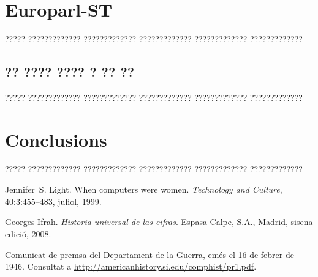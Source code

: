 \documentclass[11pt,english,listoffigures,listoftables]{tfgetsinf}
\begin{document}
\chapter{Europarl-ST}

????? ????????????? ????????????? ????????????? ????????????? ????????????? 

\section{?? ???? ???? ? ?? ??}

????? ????????????? ????????????? ????????????? ????????????? ?????????????


\chapter{Conclusions}

????? ????????????? ????????????? ????????????? ????????????? ????????????? 


\begin{thebibliography}{10}

   Jennifer~S. Light.
   \newblock When computers were women.
   \newblock \textit{Technology and Culture}, 40:3:455--483, juliol, 1999.

   Georges Ifrah.
   \newblock \textit{Historia universal de las cifras}.
   \newblock Espasa Calpe, S.A., Madrid, sisena edició, 2008.

   Comunicat de premsa del Departament de la Guerra, 
   emés el 16 de febrer de 1946. 
   \newblock Consultat a 
   \url{http://americanhistory.si.edu/comphist/pr1.pdf}.

\end{thebibliography}
\cleardoublepage
\end{document}
